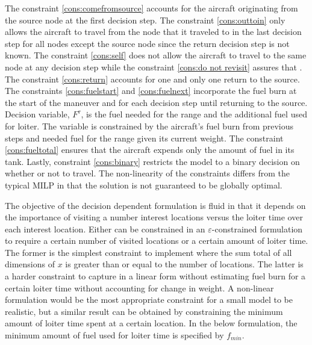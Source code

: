 The constraint \eqref{cons:comefromsource} accounts for the aircraft originating from the source node at the first decision step. The constraint \eqref{cons:outtoin} only allows the aircraft to travel from the node that it traveled to in the last decision step for all nodes except the source node since the return decision step is not known. The constraint \eqref{cons:self} does not allow the aircraft to travel to the same node at any decision step while the constraint \eqref{cons:do not revisit} assures that .  The constraint \eqref{cons:return} accounts for one and only one return to the source. The constraints \eqref{cons:fuelstart} and \eqref{cons:fuelnext} incorporate the fuel burn at the start of the maneuver and for each decision step until returning to the source. Decision variable, $F^{\tau}$, is the fuel needed for the range and the additional fuel used for loiter. The variable is constrained by the aircraft's fuel burn from previous steps and needed fuel for the range given its current weight. The constraint \eqref{cons:fueltotal} ensures that the aircraft expends only the amount of fuel in its tank. Lastly, constraint \eqref{cons:binary} restricts the model to a binary decision on whether or not to travel. The non-linearity of the constraints differs from the typical MILP in that the solution is not guaranteed to be globally optimal.\par
The objective of the decision dependent formulation is fluid in that it depends on the importance of visiting a number interest locations versus the loiter time over each interest location. Either can be constrained in an $\varepsilon$-constrained formulation to require a certain number of visited locations or a certain amount of loiter time. The former is the simplest constraint to implement where the sum total of all dimensions of $x$ is greater than or equal to the number of locations. The latter is a harder constraint to capture in a linear form without estimating fuel burn for a certain loiter time without accounting for change in weight. A non-linear formulation would be the most appropriate constraint for a small model to be realistic, but a similar result can be obtained by constraining the minimum amount of loiter time spent at a certain location. In the below formulation, the minimum amount of fuel used for loiter time is specified by $f_{min}$.

